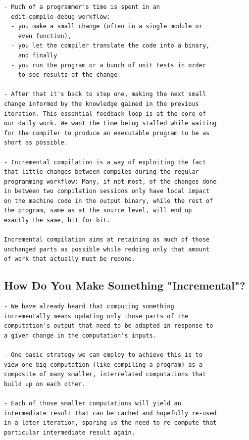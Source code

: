 \documentclass[12pt, a4paper]{report}
\begin{document}
\begin{verbatim}
- Much of a programmer's time is spent in an
  edit-compile-debug workflow:
  - you make a small change (often in a single module or
    even function),
  - you let the compiler translate the code into a binary,
    and finally
  - you run the program or a bunch of unit tests in order
    to see results of the change.

- After that it's back to step one, making the next small
change informed by the knowledge gained in the previous
iteration. This essential feedback loop is at the core of
our daily work. We want the time being stalled while waiting
for the compiler to produce an executable program to be as
short as possible.

- Incremental compilation is a way of exploiting the fact
that little changes between compiles during the regular
programming workflow: Many, if not most, of the changes done
in between two compilation sessions only have local impact
on the machine code in the output binary, while the rest of
the program, same as at the source level, will end up
exactly the same, bit for bit.

Incremental compilation aims at retaining as much of those
unchanged parts as possible while redoing only that amount
of work that actually must be redone.
\end{verbatim}
\cite{rust_blog_incremental_compilation}

\subsection*{How Do You Make Something "Incremental"? \cite{rust_blog_incremental_compilation}}

\begin{verbatim}
- We have already heard that computing something
incrementally means updating only those parts of the
computation's output that need to be adapted in response to
a given change in the computation's inputs.

- One basic strategy we can employ to achieve this is to
view one big computation (like compiling a program) as a
composite of many smaller, interrelated computations that
build up on each other.

- Each of those smaller computations will yield an
intermediate result that can be cached and hopefully re-used
in a later iteration, sparing us the need to re-compute that
particular intermediate result again.
\end{verbatim}
\cite{rust_blog_incremental_compilation}
\end{document}
